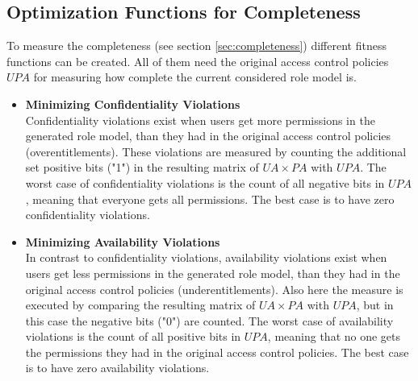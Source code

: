         \subsection{Optimization Functions for Completeness}
        \label{sec:optimizationCompleteness}
        To measure the completeness (see section \ref{sec:completeness}) different fitness functions can be created. All of them need the original access control policies $UPA$ for measuring how complete the current considered role model is.
        \begin{itemize}
            \item \textbf{Minimizing Confidentiality Violations}\\
            Confidentiality violations exist when users get more permissions in the generated role model, than they had in the original access control policies (overentitlements). These violations are measured by counting the additional set positive bits ("1") in the resulting matrix of $UA \times PA$ with $UPA$. The worst case of confidentiality violations is the count of all negative bits in $UPA$, meaning that everyone gets all permissions. The best case is to have zero confidentiality violations.
            \item \textbf{Minimizing Availability Violations}\\
            In contrast to confidentiality violations, availability violations exist when users get less permissions in the generated role model, than they had in the original access control policies (underentitlements). Also here the measure is executed by comparing the resulting matrix of $UA \times PA$ with $UPA$, but in this case the negative bits ("0") are counted. The worst case of availability violations is the count of all positive bits in $UPA$, meaning that no one gets the permissions they had in the original access control policies. The best case is to have zero availability violations.

\end{itemize}
